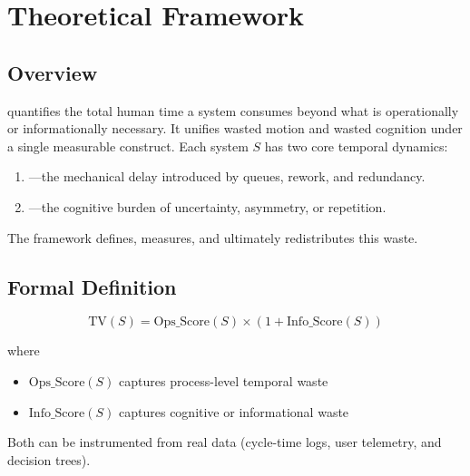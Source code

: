 
\section{Theoretical Framework}
\label{sec:theory}

\subsection{Overview}
\label{sec:theory-overview}

 quantifies the total human time a system consumes beyond what is operationally or informationally necessary. It unifies wasted motion and wasted cognition under a single measurable construct. Each system $S$ has two core temporal dynamics:

\begin{enumerate}
    \item {}—the mechanical delay introduced by queues, rework, and redundancy.
    \item {}—the cognitive burden of uncertainty, asymmetry, or repetition.
\end{enumerate}

The framework defines, measures, and ultimately redistributes this waste.

\subsection{Formal Definition}
\label{sec:formal-definition}

\begin{equation}
\label{eq:tv-formal}
\text{TV}(S) = \text{Ops\_Score}(S) \times (1 + \text{Info\_Score}(S))
\end{equation}

where
\begin{itemize}
    \item $\text{Ops\_Score}(S)$ captures process-level temporal waste
    \item $\text{Info\_Score}(S)$ captures cognitive or informational waste
\end{itemize}

Both can be instrumented from real data (cycle-time logs, user telemetry, and decision trees).

